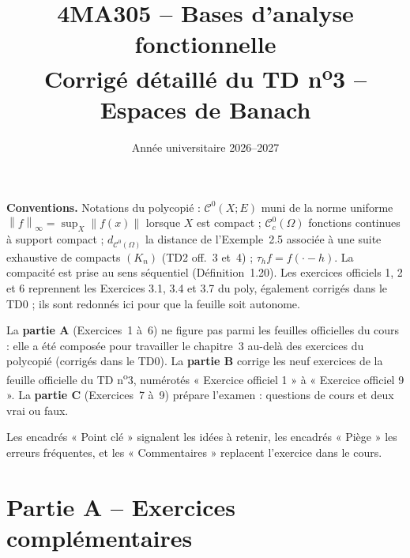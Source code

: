 \documentclass[11pt,a4paper]{article}
\title{\textbf{4MA305 -- Bases d'analyse fonctionnelle}\\[2mm]
\Large Corrigé détaillé du TD n\textsuperscript{o}3 -- Espaces de Banach}
\author{}
\date{Année universitaire 2026--2027}
\newcommand{\norm}[1]{\left\|#1\right\|}
\newcommand{\Cz}{\mathcal{C}^0}
\newcommand{\Cc}{\mathcal{C}^0_c}
\theoremstyle{definition}
\begin{document}
\maketitle

\begin{commentaire}
\textbf{Conventions.} Notations du polycopié : $\Cz(X;E)$ muni de la norme uniforme $\norm f_\infty=\sup_X\norm{f(x)}$ lorsque $X$ est compact ; $\Cc(\Omega)$ fonctions continues à support compact ; $d_{\Cz(\Omega)}$ la distance de l'Exemple~2.5 associée à une suite exhaustive de compacts $(K_n)$ (TD2 off.~3 et~4) ; $\tau_hf=f(\cdot-h)$. La compacité est prise au sens séquentiel (Définition~1.20). Les exercices officiels 1, 2 et 6 reprennent les Exercices 3.1, 3.4 et 3.7 du poly, également corrigés dans le TD0 ; ils sont redonnés ici pour que la feuille soit autonome.

La \textbf{partie A} (Exercices~1 à~6) ne figure pas parmi les feuilles officielles du cours : elle a été composée pour travailler le chapitre~3 au-delà des exercices du polycopié (corrigés dans le TD0). La \textbf{partie B} corrige les neuf exercices de la feuille officielle du TD n\textsuperscript{o}3, numérotés « Exercice officiel 1 » à « Exercice officiel 9 ». La \textbf{partie C} (Exercices~7 à~9) prépare l'examen : questions de cours et deux vrai ou faux.

Les encadrés « Point clé » signalent les idées à retenir, les encadrés « Piège » les erreurs fréquentes, et les « Commentaires » replacent l'exercice dans le cours.
\end{commentaire}

\section*{Partie A -- Exercices complémentaires}
\end{document}
